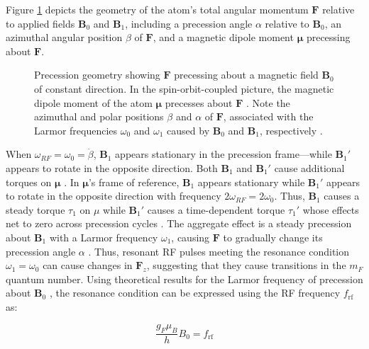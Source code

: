 \documentclass[11pt]{article}
\begin{document}
Figure \ref{fig:dipole_torque} depicts the geometry of the atom's
total angular momentum $\mathbf{F}$ relative to applied fields $\mathbf{B}_0$
and $\mathbf{B}_1$, including a precession angle $\alpha$ relative to
$\mathbf{B}_0$, an azimuthal angular position $\beta$ of $\mathbf{F}$, and a
magnetic dipole moment $\mathbf{\mu}$ precessing about $\mathbf{F}$.

\begin{figure}[H]
  \centering
  
  \caption{Precession geometry showing $\mathbf{F}$ precessing about a
    magnetic field $\mathbf{B}_0$ of constant direction. In the
    spin-orbit-coupled picture, the magnetic dipole moment of the
    atom $\mathbf{\mu}$
    precesses about $\mathbf{F}$ \cite{harris}. Note the azimuthal
    and polar positions
    $\beta$ and $\alpha$ of
    $\mathbf{F}$, associated with the Larmor frequencies $\omega_0$
    and $\omega_1$
    caused by $\mathbf{B}_0$ and $\mathbf{B}_1$, respectively
    \cite{knight, young}.
  }
  \label{fig:dipole_torque}
\end{figure}

When
$\omega_{RF} = \omega_0 = \dot \beta$,
$\mathbf{B}_1$ appears
stationary in the precession frame---while $\mathbf{B}_{1}'$ appears to
rotate in the opposite direction.
Both $\mathbf{B}_1$ and $\mathbf{B}_{1}'$
cause additional torques
on $\mathbf{\mu}$ \cite{young, knight, harris}. In $\mathbf{\mu}$'s
frame of reference,
$\mathbf{B}_1$ appears
stationary while $\mathbf{B}_{1}'$ appears to rotate in the opposite
direction with frequency $2\omega_{RF} = 2\omega_0$. Thus, $\mathbf{B}_1$ causes
a steady torque $\tau_1$ on $\mu$ while $\mathbf{B}_{1}'$ causes a
time-dependent
torque $\tau_{1}'$ whose effects net to zero across precession
cycles \cite{knight, young}. The aggregate effect is a steady
precession about $\mathbf{B}_1$ with a Larmor frequency $\omega_1$,
causing $\mathbf{F}$ to
gradually change its precession angle $\alpha$ \cite{harris}. Thus, resonant
RF pulses meeting the
resonance condition $\omega_1 = \omega_0$ can cause
changes in $\mathbf{F}_z$, suggesting that they cause transitions in
the $m_F$ quantum number. Using theoretical results for the Larmor
frequency of precession about $\mathbf{B}_0$ \cite{harris, griff,
young}, the resonance condition
can be expressed using the RF frequency $f_\text{rf}$ as:

\begin{equation}
  \frac{g_F \mu_B}{h} B_0 = f_\text{rf}
  \label{eq:resonance_condition}
\end{equation}
\end{document}
